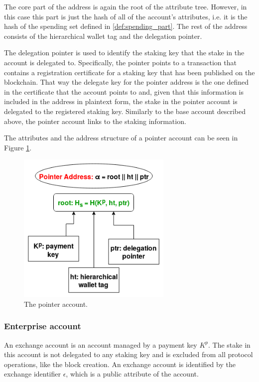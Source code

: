 The core part of the address is again the root of the attribute tree. However, in this case this part is just the hash of all of the account's attributes, i.e. it is the hash of the spending set defined in \ref{def:spending_part}. The rest of the address consists of the hierarchical wallet tag and the delegation pointer.

The delegation pointer is used to identify the staking key that the stake in the account is delegated to. Specifically, the pointer points to a transaction that contains a registration certificate for a staking key that has been published on the blockchain. That way the delegate key for the pointer address is the one defined in the certificate that the account points to and, given that this information is included in the address in plaintext form, the stake in the pointer account is delegated to the registered staking key. Similarly to the base account described above, the pointer account links to the staking information.

The attributes and the address structure of a pointer account can be seen in Figure \ref{fig:pointer_account}.

\begin{figure}
  \begin{center}
    \includegraphics[width=210pt]{figures/pointer_account.png}
  \end{center}
  \caption{The pointer account.}
  \label{fig:pointer_account}
\end{figure}

\subsubsection{Enterprise account}\label{subsubsec:exchange_account_plain}

An exchange account is an account managed by a payment key $K^p$. The stake in this account is not delegated to any staking key and is excluded from all protocol operations, like the block creation. An exchange account is identified by the exchange identifier $\epsilon$, which is a public attribute of the account.

